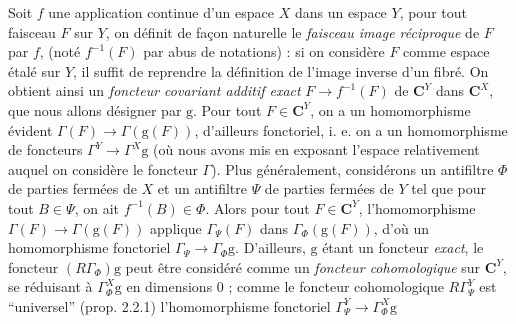 Soit $f$ une application continue d'un espace $X$ dans un espace $Y$, pour
tout faisceau $F$ sur $Y$, on définit de façon naturelle le \textit{faisceau
image réciproque} de $F$ par $f$, (noté $f^{-1}(F)$ par abus de notations) :
si on considère $F$ comme espace étalé sur $Y$, il suffit de reprendre la
définition de l'image inverse d'un fibré. On obtient ainsi un \textit{foncteur
covariant additif exact} $F\to f^{-1}(F)$ de $\mathbf C^Y$ dans $\mathbf C^X$, que
nous allons désigner par $\mathrm{g}$. Pour tout $F\in \mathbf C^Y$, on a un homomorphisme
évident $\Gamma(F)\to\Gamma(\mathrm{g}(F))$, d'ailleurs fonctoriel, i. e.
on a un homomorphisme de foncteurs
$\Gamma^Y\to\Gamma^X\mathrm{g}$ (où nous avons mis en exposant l'espace
relativement auquel on considère le foncteur $\Gamma$). Plus généralement,
considérons un antifiltre $\Phi$ de parties fermées de $X$ et un antifiltre
$\Psi$ de parties fermées de $Y$ tel que pour tout $B\in\Psi$, on ait
$f^{-1}(B)\in\Phi$. Alors pour tout $F\in \mathbf C^Y$, l'homomorphisme
$\Gamma(F)\to\Gamma(\mathrm{g}(F))$ applique $\Gamma_\Psi(F)$ dans
$\Gamma_\Phi(\mathrm{g}(F))$, d'où un homomorphisme fonctoriel
$\Gamma_\Psi\to\Gamma_\Phi \mathrm{g}$. D'ailleurs, $\mathrm{g}$ étant un
foncteur \textit{exact}, le foncteur $(R\Gamma_\Phi)\mathrm{g}$ peut être considéré comme un
\textit{foncteur cohomologique} sur $\mathbf C^Y$, se réduisant à $\Gamma^X_\Phi \mathrm{g}$ en
dimensions 0 ; comme le foncteur cohomologique $R\Gamma^Y_\Psi$ est
``universel'' (prop. 2.2.1) l'homomorphisme fonctoriel
$\Gamma^Y_\Psi\to\Gamma^X_\Phi \mathrm{g}$

